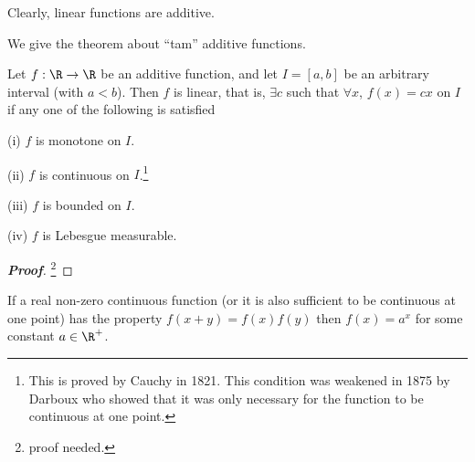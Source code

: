 \begin{remark}
Clearly, linear functions are additive.
\end{remark}

We give the theorem about ``tam'' additive functions.

\begin{theorem}
Let $f : \R \to \R$ be an additive function, and let $I = [a,b]$ be an arbitrary interval (with $a < b$). Then $f$ is linear, that is, $\exists c$ such that $\forall x$, $f(x) = cx$ on $I$ if any one of the following is satisfied
\ben
\item [(i)] $f$ is monotone on $I$.
\item [(ii)] $f$ is continuous on $I$.\footnote{This is proved by Cauchy in 1821. This condition was weakened in 1875 by Darboux who showed that it was only necessary for the function to be continuous at one point.}
\item [(iii)] $f$ is bounded on $I$.
\item [(iv)] $f$ is Lebesgue measurable.
\een
\end{theorem}

\begin{proof}[\bf Proof]
\footnote{proof needed.}
\end{proof}


\begin{theorem}\label{thm:function_product_is_function_of_sum_continuous_version}
If a real non-zero continuous function (or it is also sufficient to be continuous at one point) has the property $f(x+y) = f(x)f(y)$ then $f(x) = a^{x}$ for some constant $a\in \R^+$.
\end{theorem}


